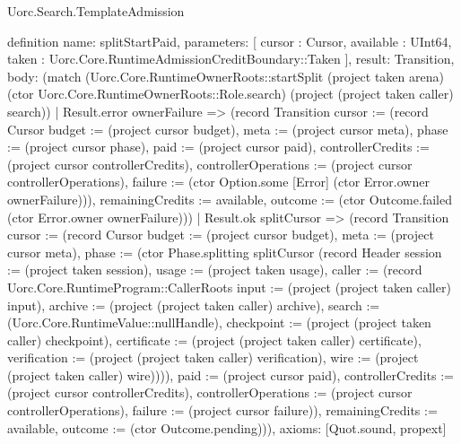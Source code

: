 \begin{lexlean}{Uorc.Search.TemplateAdmission}
\begin{semanticmodule}
definition{
  name: splitStartPaid,
  parameters: [
    cursor : Cursor,
    available : UInt64,
    taken : Uorc.Core.RuntimeAdmissionCreditBoundary::Taken
  ],
  result: Transition,
  body: (match (Uorc.Core.RuntimeOwnerRoots::startSplit (project taken arena) (ctor Uorc.Core.RuntimeOwnerRoots::Role.search) (project (project taken caller) search))
    | Result.error ownerFailure => (record Transition {cursor := (record Cursor {budget := (project cursor budget), meta := (project cursor meta), phase := (project cursor phase), paid := (project cursor paid), controllerCredits := (project cursor controllerCredits), controllerOperations := (project cursor controllerOperations), failure := (ctor Option.some [Error] (ctor Error.owner ownerFailure))}), remainingCredits := available, outcome := (ctor Outcome.failed (ctor Error.owner ownerFailure))})
    | Result.ok splitCursor => (record Transition {cursor := (record Cursor {budget := (project cursor budget), meta := (project cursor meta), phase := (ctor Phase.splitting splitCursor (record Header {session := (project taken session), usage := (project taken usage), caller := (record Uorc.Core.RuntimeProgram::CallerRoots {input := (project (project taken caller) input), archive := (project (project taken caller) archive), search := (Uorc.Core.RuntimeValue::nullHandle), checkpoint := (project (project taken caller) checkpoint), certificate := (project (project taken caller) certificate), verification := (project (project taken caller) verification), wire := (project (project taken caller) wire)})})), paid := (project cursor paid), controllerCredits := (project cursor controllerCredits), controllerOperations := (project cursor controllerOperations), failure := (project cursor failure)}), remainingCredits := available, outcome := (ctor Outcome.pending)})),
  axioms: [Quot.sound, propext]
}


\end{semanticmodule}
\end{lexlean}
